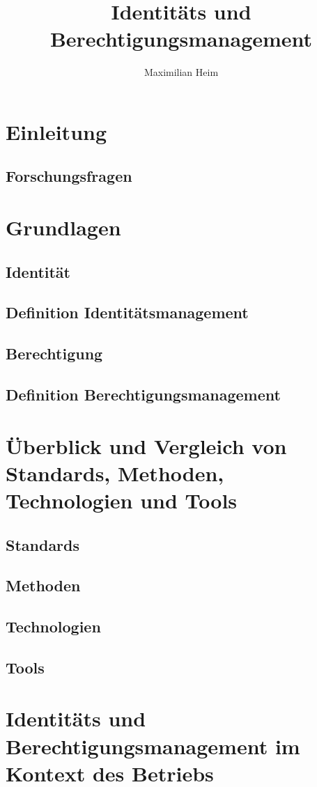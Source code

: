 \documentclass[10pt]{article}
\author{Maximilian Heim}
\title{Identitäts und Berechtigungsmanagement}
\begin{document}
\maketitle
\newpage
\tableofcontents
\newpage
\section{Einleitung}
\subsection{Forschungsfragen}
\section{Grundlagen}
\subsection{Identität}
\subsection{Definition Identitätsmanagement}
\subsection{Berechtigung}
\subsection{Definition Berechtigungsmanagement}
\section{Überblick und Vergleich von Standards, Methoden, Technologien und Tools}
\subsection{Standards}
\subsection{Methoden}
\subsection{Technologien}
\subsection{Tools}
\section{Identitäts und Berechtigungsmanagement im Kontext des Betriebs}
\end{document}
